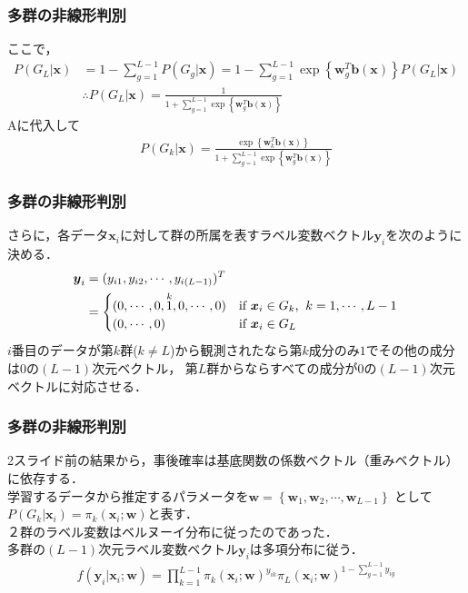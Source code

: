 \documentclass[dvipdfmx,cjk]{beamer}
\theoremstyle{example}
\begin{document}
\begin{frame}
    \frametitle{多群の非線形判別}

    ここで，
    \begin{align*}
        P(G_L|\boldsymbol{x}) & =1-\sum\limits_{g=1}^{L-1}P(G_g|\boldsymbol{x})=1-\sum\limits_{g=1}^{L-1}\exp\left\{\boldsymbol{w}_g^T\boldsymbol{b}(\boldsymbol{x})\right\}P(G_L|\boldsymbol{x}) \\
                              & \therefore P(G_L|\boldsymbol{x})=\frac{1}{1+\sum\limits_{g=1}^{L-1}\exp\left\{\boldsymbol{w}_g^T\boldsymbol{b}(\boldsymbol{x})\right\}}
    \end{align*}
    Aに代入して
    \begin{align*}
        P(G_k|\boldsymbol{x})=\frac{\exp\left\{\boldsymbol{w}_k^T\boldsymbol{b}(\boldsymbol{x})\right\}}{1+\sum\limits_{g=1}^{L-1}\exp\left\{\boldsymbol{w}_g^T\boldsymbol{b}(\boldsymbol{x})\right\}}
    \end{align*}
\end{frame}
\begin{frame}
    \frametitle{多群の非線形判別}
    さらに，各データ$\boldsymbol{x}_i$に対して群の所属を表すラベル変数ベクトル$\boldsymbol{y}_i$を次のように決める．
    \begin{align*}
        \boldsymbol{y}_i & =(y_{i1},y_{i2},\cdots ,y_{i(L-1)})^T                                                                        \\
                         & =\begin{cases}
                                (0,\cdots,0,\overset{k}{1},0,\cdots ,0) & \text{if $\boldsymbol{x}_i \in G_k$,\: $k=1,\cdots ,L-1$} \\
                                (0,\cdots ,0)                           & \text{if $\boldsymbol{x}_i \in G_L$}
                            \end{cases}
    \end{align*}
    $i$番目のデータが第$k$群($k\neq L$)から観測されたなら第$k$成分のみ$1$でその他の成分は$0$の$(L-1)$次元ベクトル，
    第$L$群からならすべての成分が$0$の$(L-1)$次元ベクトルに対応させる．
\end{frame}
\begin{frame}
    \frametitle{多群の非線形判別}
    2スライド前の結果から，事後確率は基底関数の係数ベクトル（重みベクトル）に依存する．\\
    学習するデータから推定するパラメータを$\boldsymbol{w}=\left\{\boldsymbol{w}_1,\boldsymbol{w}_2,\cdots ,\boldsymbol{w}_{L-1}\right\}$
    として$P(G_k|\boldsymbol{x}_i)=\pi_k(\boldsymbol{x}_i;\boldsymbol{w})$と表す．\\
    ２群のラベル変数はベルヌーイ分布に従ったのであった．\\
    多群の$(L-1)$次元ラベル変数ベクトル$\boldsymbol{y}_i$は多項分布に従う．
    \begin{align*}
        f(\boldsymbol{y}_i|\boldsymbol{x}_i;\boldsymbol{w})=\prod_{k=1}^{L-1}\pi_k(\boldsymbol{x}_i;\boldsymbol{w})^{y_{ik}}\pi_L(\boldsymbol{x}_i;\boldsymbol{w})^{1-\sum\limits_{g=1}^{L-1}y_{ig}}
    \end{align*}
\end{frame}
\end{document}
